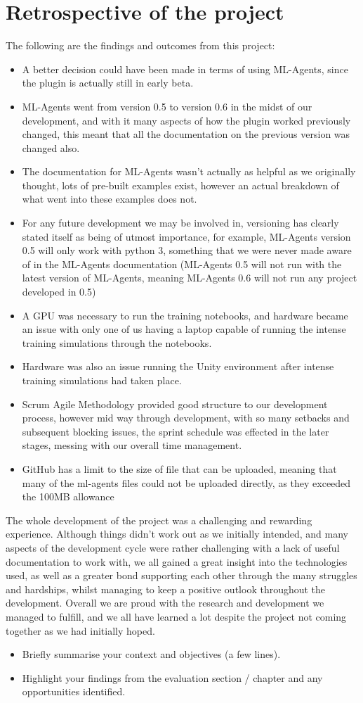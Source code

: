\section{Retrospective of the project}
The following are the findings and outcomes from this project:
\begin{itemize}
    \item{A better decision could have been made in terms of using ML-Agents, since the plugin is actually still in early beta.}
    \item{ML-Agents went from version 0.5 to version 0.6 in the midst of our development, and with it many aspects of how the plugin worked previously changed, this meant that all the documentation on the previous version was changed also.}
    \item{The documentation for ML-Agents wasn't actually as helpful as we originally thought, lots of pre-built examples exist, however an actual breakdown of what went into these examples does not.}
    \item{For any future development we may be involved in, versioning has clearly stated itself as being of utmost importance, for example, ML-Agents version 0.5 will only work with python 3, something that we were never made aware of in the ML-Agents documentation (ML-Agents 0.5 will not run with the latest version of ML-Agents, meaning ML-Agents 0.6 will not run any project developed in 0.5)}
    \item{A GPU was necessary to run the training notebooks, and hardware became an issue with only one of us having a laptop capable of running the intense training simulations through the notebooks.}
    \item{Hardware was also an issue running the Unity environment after intense training simulations had taken place.}
    \item{Scrum Agile Methodology provided good structure to our development process, however mid way through development, with so many setbacks and subsequent blocking issues, the sprint schedule was effected in the later stages, messing with our overall time management.}
    \item{GitHub has a limit to the size of file that can be uploaded, meaning that many of the ml-agents files could not be uploaded directly, as they exceeded the 100MB allowance}
\end{itemize}


The whole development of the project was a challenging and rewarding experience. Although things didn't work out as we initially intended, and many aspects of the development cycle were rather challenging with a lack of useful documentation to work with, we all gained a great insight into the technologies used, as well as a greater bond supporting each other through the many struggles and hardships, whilst managing to keep a positive outlook throughout the development. Overall we are proud with the research and development we managed to fulfill, and we all have learned a lot despite the project not coming together as we had initially hoped.


\begin{itemize}
\item Briefly summarise your context and objectives (a few lines).
\item Highlight your findings from the evaluation section / chapter and any opportunities identified.
\end{itemize}